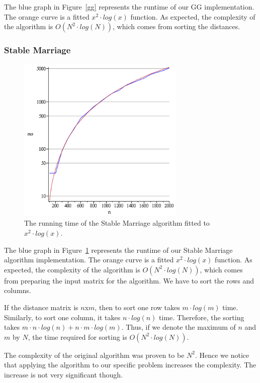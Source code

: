 \documentclass[a4paper,11pt]{article}
\begin{document}
The blue graph in Figure~\ref{gg} represents the runtime of our GG implementation. The orange curve is a fitted $x^2 \cdot log(x)$ function. As expected, the complexity of the algorithm is $O(N^{2} \cdot log(N))$, which comes from sorting the distances.

\subsubsection{Stable Marriage}

\begin{figure}[ht!]
\centering 
\includegraphics[width=80mm]{SM_runtime.png}
\caption{The running time of the Stable Marriage algorithm fitted to $x^2 \cdot log(x)$.}
\label{sm} 
\end{figure}

The blue graph in Figure~\ref{sm} represents the runtime of our Stable Marriage algorithm implementation. The orange curve is a fitted $x^2 \cdot log(x)$ function. As expected, the complexity of the algorithm is $O(N^{2} \cdot log(N))$, which comes from preparing the input matrix for the algorithm. We have to sort the rows and columns.

  If the distance matrix is $n$x$m$, then to sort one row takes $m \cdot log(m)$ time. Similarly, to sort one column, it takes $n \cdot log(n)$ time. Therefore, the sorting takes $m \cdot n \cdot log(n) + n \cdot m \cdot log(m)$. Thus, if we denote the maximum of $n$ and $m$ by $N$, the time required for sorting is $O(N^{2} \cdot log(N))$. 

The complexity of the original algorithm was proven to be $N^{2}$. Hence we notice that applying the algorithm to our specific problem increases the complexity. The increase is not very significant though.
\end{document}
